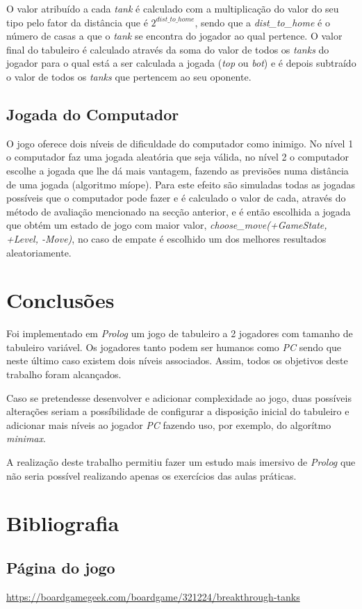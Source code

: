 \documentclass[a4paper,11pt,portuguese]{article}
\begin{document}
    O valor atribuído a cada \textit{tank} é calculado com a multiplicação do valor do seu tipo
    pelo fator da distância que é $ 2^{dist\_to\_home} $, sendo que a \textit{dist\_to\_home}
    é o número de casas a que o \textit{tank} se encontra do jogador ao qual pertence.
    O valor final do tabuleiro é calculado através da soma do valor de todos os \textit{tanks}
    do jogador para o qual está a ser calculada a jogada (\textit{top} ou \textit{bot}) e é
    depois subtraído o valor de todos os \textit{tanks} que pertencem ao seu oponente.


    \subsection{Jogada do Computador}

    O jogo oferece dois níveis de dificuldade do computador como inimigo.
    No nível 1 o computador faz uma jogada aleatória que seja válida, no nível 2
    o computador escolhe a jogada que lhe dá mais vantagem, fazendo as previsões
    numa distância de uma jogada (algoritmo míope). Para este efeito são simuladas todas
    as jogadas possíveis que o computador pode fazer e é calculado o valor de cada, através 
    do método de avaliação mencionado na secção anterior, e é então escolhida a jogada que obtém 
    um estado de jogo com maior valor, \textit{choose\_move(+GameState, +Level, -Move)}, no
    caso de empate é escolhido um dos melhores resultados aleatoriamente. 



\section{Conclusões}

Foi implementado em \textit{Prolog} um jogo de tabuleiro a 2 jogadores com tamanho de tabuleiro
variável. Os jogadores tanto podem ser humanos como \textit{PC} sendo que neste último caso
existem dois níveis associados. Assim, todos os objetivos deste trabalho foram alcançados. \par

Caso se pretendesse desenvolver e adicionar complexidade ao jogo, duas possíveis alterações
seriam a possíbilidade de configurar a disposição inicial do tabuleiro e adicionar mais níveis
ao jogador \textit{PC} fazendo uso, por exemplo, do algorítmo \textit{minimax}. \par

A realização deste trabalho permitiu fazer um estudo mais imersivo de \textit{Prolog} que não
seria possível realizando apenas os exercícios das aulas práticas.


\section{Bibliografia}

\subsection{Página do jogo}
\href{https://boardgamegeek.com/boardgame/321224/breakthrough-tanks}{https://boardgamegeek.com/boardgame/321224/breakthrough-tanks}
\end{document}
